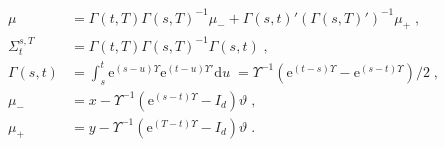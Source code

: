 \documentclass[12pt]{article}
\newcommand{\rmd}{\mathrm{d}}
\newcommand{\eqsp}{\;}
\newcommand{\1}{\mathrm{1}}
\begin{document}
\begin{align*}
\mu &=\Gamma(t,T)\Gamma(s,T)^{-1}\mu_- + \Gamma(s,t)'(\Gamma(s,T)')^{-1}\mu_+\eqsp,\\
\Sigma_t^{s,T} &=\Gamma(t,T)\Gamma(s,T)^{-1}\Gamma(s,t)\eqsp,\\
\Gamma(s,t)&=\int_s^{t} \mathrm{e}^{(s -u)\Upsilon}\mathrm{e}^{(t -u)\Upsilon'}\rmd u\eqsp = \Upsilon^{-1}\left(\mathrm{e}^{(t -s)\Upsilon}-\mathrm{e}^{(s -t)\Upsilon}\right)/2\eqsp,\\
\mu_- &= x - \Upsilon^{-1}(\mathrm{e}^{(s -t)\Upsilon}-I_d)\vartheta\eqsp,\\
\mu_+ &= y-\Upsilon^{-1}(\mathrm{e}^{(T -t)\Upsilon}-I_d)\vartheta\eqsp.
\end{align*}




\end{document}
